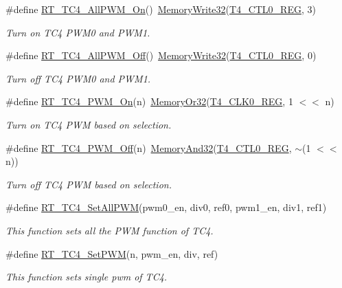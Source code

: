 \begin{DoxyCompactItemize}
\item 
\#define \mbox{\hyperlink{a00086_af7e9317dddf60349a86619afdef1fba8}{R\+T\+\_\+\+T\+C4\+\_\+\+All\+P\+W\+M\+\_\+\+On}}()~\mbox{\hyperlink{a00026_a6b9732365b12e48ddb89fe1028b975b0}{Memory\+Write32}}(\mbox{\hyperlink{a00026_a83136367fd85cd43cec90995ad0f51ef}{T4\+\_\+\+C\+T\+L0\+\_\+\+R\+EG}}, 3)
\begin{DoxyCompactList}\small\item\em Turn on T\+C4 P\+W\+M0 and P\+W\+M1. \end{DoxyCompactList}\item 
\#define \mbox{\hyperlink{a00086_a810820140a90f26db974ea72d81fac27}{R\+T\+\_\+\+T\+C4\+\_\+\+All\+P\+W\+M\+\_\+\+Off}}()~\mbox{\hyperlink{a00026_a6b9732365b12e48ddb89fe1028b975b0}{Memory\+Write32}}(\mbox{\hyperlink{a00026_a83136367fd85cd43cec90995ad0f51ef}{T4\+\_\+\+C\+T\+L0\+\_\+\+R\+EG}}, 0)
\begin{DoxyCompactList}\small\item\em Turn off T\+C4 P\+W\+M0 and P\+W\+M1. \end{DoxyCompactList}\item 
\#define \mbox{\hyperlink{a00086_a383c7817a2e822ccda0e28744c7d3d76}{R\+T\+\_\+\+T\+C4\+\_\+\+P\+W\+M\+\_\+\+On}}(n)~\mbox{\hyperlink{a00026_a27874a97deab7cecdde5ddecf466e31e}{Memory\+Or32}}(\mbox{\hyperlink{a00026_af2047cbb251e0693548f017a0874efbf}{T4\+\_\+\+C\+L\+K0\+\_\+\+R\+EG}}, 1 $<$$<$ n)
\begin{DoxyCompactList}\small\item\em Turn on T\+C4 P\+WM based on selection. \end{DoxyCompactList}\item 
\#define \mbox{\hyperlink{a00086_aaa61aa650a6b2f59bbcb78ae836c82e9}{R\+T\+\_\+\+T\+C4\+\_\+\+P\+W\+M\+\_\+\+Off}}(n)~\mbox{\hyperlink{a00026_ad87cedffcaadc51db22594fce55173d4}{Memory\+And32}}(\mbox{\hyperlink{a00026_a83136367fd85cd43cec90995ad0f51ef}{T4\+\_\+\+C\+T\+L0\+\_\+\+R\+EG}}, $\sim$(1 $<$$<$ n))
\begin{DoxyCompactList}\small\item\em Turn off T\+C4 P\+WM based on selection. \end{DoxyCompactList}\item 
\#define \mbox{\hyperlink{a00086_ad6b804bb230129a442fe9ce55e3bd2f6}{R\+T\+\_\+\+T\+C4\+\_\+\+Set\+All\+P\+WM}}(pwm0\+\_\+en,  div0,  ref0,  pwm1\+\_\+en,  div1,  ref1)
\begin{DoxyCompactList}\small\item\em This function sets all the P\+WM function of T\+C4. \end{DoxyCompactList}\item 
\#define \mbox{\hyperlink{a00086_ada2806f77e8e1cf7e64c5b9e13479119}{R\+T\+\_\+\+T\+C4\+\_\+\+Set\+P\+WM}}(n,  pwm\+\_\+en,  div,  ref)
\begin{DoxyCompactList}\small\item\em This function sets single pwm of T\+C4. \end{DoxyCompactList}\end{DoxyCompactItemize}


